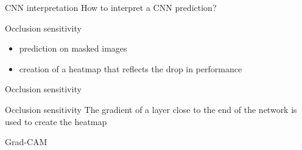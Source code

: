 \begin{frame}{CNN interpretation}
  How to interpret a CNN prediction?
\end{frame}

\begin{frame}{Occlusion sensitivity}
  \begin{itemize}
    \item prediction on masked images
    \item creation of a heatmap that reflects the drop in performance
  \end{itemize}
\end{frame}

\begin{frame}{Occlusion sensitivity}
\end{frame}

\begin{frame}{Occlusion sensitivity}
  The gradient of a layer close to the end of the network is used to create the heatmap
\end{frame}

\begin{frame}{Grad-CAM}
\end{frame}
  